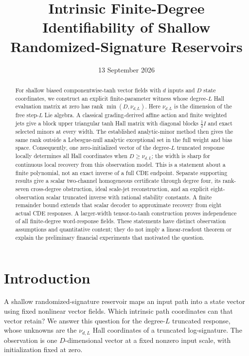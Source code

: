 \documentclass[11pt,a4paper]{article}
\title{Intrinsic Finite-Degree Identifiability of Shallow\\Randomized-Signature Reservoirs}
\author{}
\date{13 September 2026}
\numberwithin{equation}{section}
\theoremstyle{definition}
\theoremstyle{remark}
\begin{document}
\maketitle
\begin{abstract}
For shallow biased componentwise-tanh vector fields with $d$ inputs and
$D$ state coordinates, we construct an explicit finite-parameter witness
whose degree-$L$ Hall evaluation matrix at zero has rank
$\min(D,\nu_{d,L})$. Here $\nu_{d,L}$ is the dimension of the free step-$L$
Lie algebra. A classical grading-derived affine action and finite weighted
jets give a block upper triangular tanh Hall matrix with diagonal blocks
$\tfrac12 I$ and exact selected minors at every width. The established
analytic-minor method then gives the same rank outside a Lebesgue-null
analytic exceptional set in the full weight and bias space.
Consequently, one zero-initialized vector of the
degree-$L$ truncated response locally determines all Hall coordinates
when $D\geq\nu_{d,L}$; the width is sharp for continuous local recovery
from this observation model. This is a statement about a finite
polynomial, not an exact inverse of a full CDE endpoint.
Separate supporting results give a scalar two-channel homogeneous
certificate through degree four, its rank-seven cross-degree obstruction,
ideal scale-jet reconstruction, and an explicit eight-observation scalar
truncated inverse with rational stability constants. A finite remainder
bound extends that scalar decoder to approximate recovery from eight
actual CDE responses. A larger-width tensor-to-tanh construction proves
independence of all finite-degree word-response fields. These statements
have distinct observation assumptions and quantitative content; they
do not imply a linear-readout theorem or explain the preliminary
financial experiments that motivated the question.
\end{abstract}

\tableofcontents

\section{Introduction}
A shallow randomized-signature reservoir maps an input path into a state
vector using fixed nonlinear vector fields. Which intrinsic path
coordinates can that vector retain? We answer this question for the
degree-$L$ truncated response, whose unknowns are the
$\nu_{d,L}$ Hall coordinates of a truncated log-signature. The observation
is one $D$-dimensional vector at a fixed nonzero input scale, with
initialization fixed at zero.
\end{document}
